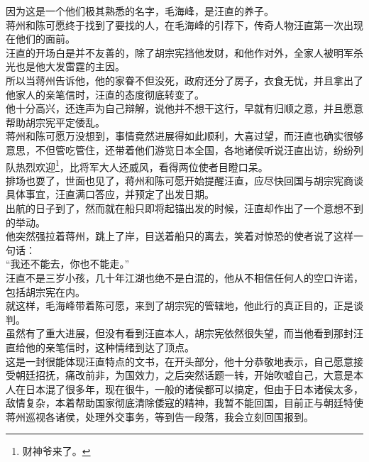 \begin{multicols}{\theparacolNo}
因为这是一个他们极其熟悉的名字，毛海峰，是汪直的养子。\\

蒋州和陈可愿终于找到了要找的人，在毛海峰的引荐下，传奇人物汪直第一次出现在他们的面前。\\

汪直的开场白是并不友善的，除了胡宗宪挡他发财，和他作对外，全家人被明军杀光也是他大发雷霆的主因。\\

所以当蒋州告诉他，他的家眷不但没死，政府还分了房子，衣食无忧，并且拿出了他家人的亲笔信时，汪直的态度彻底转变了。\\

他十分高兴，还连声为自己辩解，说他并不想干这行，早就有归顺之意，并且愿意帮助胡宗宪平定倭乱。\\

蒋州和陈可愿万没想到，事情竟然进展得如此顺利，大喜过望，而汪直也确实很够意思，不但管吃管住，还带着他们游览日本全国，各地诸侯听说汪直出访，纷纷列队热烈欢迎\footnote{财神爷来了。}，比将军大人还威风，看得两位使者目瞪口呆。\\

排场也耍了，世面也见了，蒋州和陈可愿开始提醒汪直，应尽快回国与胡宗宪商谈具体事宜，汪直满口答应，并预定了出发日期。\\

出航的日子到了，然而就在船只即将起锚出发的时候，汪直却作出了一个意想不到的举动。\\

他突然强拉着蒋州，跳上了岸，目送着船只的离去，笑着对惊恐的使者说了这样一句话：\\

“我还不能去，你也不能走。”\\

汪直不是三岁小孩，几十年江湖也绝不是白混的，他从不相信任何人的空口许诺，包括胡宗宪在内。\\

就这样，毛海峰带着陈可愿，来到了胡宗宪的管辖地，他此行的真正目的，正是谈判。\\

虽然有了重大进展，但没有看到汪直本人，胡宗宪依然很失望，而当他看到那封汪直给他的亲笔信时，这种情绪到达了顶点。\\

这是一封很能体现汪直特点的文书，在开头部分，他十分恭敬地表示，自己愿意接受朝廷招抚，痛改前非，为国效力，之后突然话题一转，开始吹嘘自己，大意是本人在日本混了很多年，现在很牛，一般的诸侯都可以搞定，但由于日本诸侯太多，敌情复杂，本着帮助国家彻底清除倭寇的精神，我暂不能回国，目前正与朝廷特使蒋州巡视各诸侯，处理外交事务，等到告一段落，我会立刻回国报到。\\


\end{multicols}
